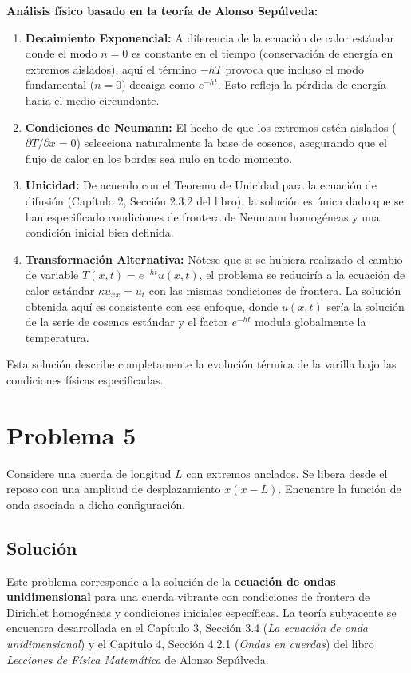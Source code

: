 \documentclass[a4paper]{article}
\begin{document}
\textbf{Análisis físico basado en la teoría de Alonso Sepúlveda:}
\begin{enumerate}
    \item \textbf{Decaimiento Exponencial:} A diferencia de la ecuación de calor estándar donde el modo $n=0$ es constante en el tiempo (conservación de energía en extremos aislados), aquí el término $-hT$ provoca que incluso el modo fundamental ($n=0$) decaiga como $e^{-ht}$. Esto refleja la pérdida de energía hacia el medio circundante.
    \item \textbf{Condiciones de Neumann:} El hecho de que los extremos estén aislados ($\partial T/\partial x = 0$) selecciona naturalmente la base de cosenos, asegurando que el flujo de calor en los bordes sea nulo en todo momento.
    \item \textbf{Unicidad:} De acuerdo con el Teorema de Unicidad para la ecuación de difusión (Capítulo 2, Sección 2.3.2 del libro), la solución es única dado que se han especificado condiciones de frontera de Neumann homogéneas y una condición inicial bien definida.
    \item \textbf{Transformación Alternativa:} Nótese que si se hubiera realizado el cambio de variable $T(x,t) = e^{-ht}u(x,t)$, el problema se reduciría a la ecuación de calor estándar $\kappa u_{xx} = u_t$ con las mismas condiciones de frontera. La solución obtenida aquí es consistente con ese enfoque, donde $u(x,t)$ sería la solución de la serie de cosenos estándar y el factor $e^{-ht}$ modula globalmente la temperatura.
\end{enumerate}

Esta solución describe completamente la evolución térmica de la varilla bajo las condiciones físicas especificadas.


\section{Problema 5}
Considere una cuerda de longitud $L$ con extremos anclados. Se libera desde el reposo con una amplitud de desplazamiento $x(x- L)$. Encuentre la función de onda asociada a dicha configuración.

\subsection{Solución}

Este problema corresponde a la solución de la \textbf{ecuación de ondas unidimensional} para una cuerda vibrante con condiciones de frontera de Dirichlet homogéneas y condiciones iniciales específicas. La teoría subyacente se encuentra desarrollada en el Capítulo 3, Sección 3.4 (\textit{La ecuación de onda unidimensional}) y el Capítulo 4, Sección 4.2.1 (\textit{Ondas en cuerdas}) del libro \textit{Lecciones de Física Matemática} de Alonso Sepúlveda.
\end{document}
